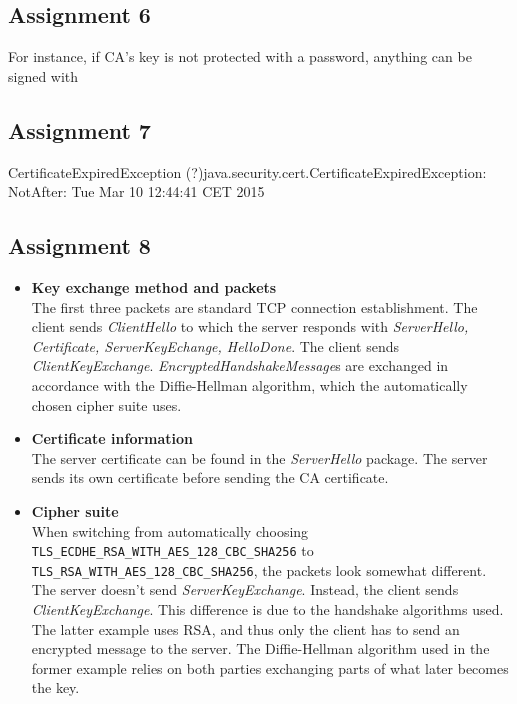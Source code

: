 \documentclass[11pt,a4paper]{article}
\begin{document}
\subsection{Assignment 6}
For instance, if CA's key is not protected with a password, anything can be signed with
\subsection{Assignment 7}
CertificateExpiredException (?)java.security.cert.CertificateExpiredException: NotAfter: Tue Mar 10 12:44:41 CET 2015
\subsection{Assignment 8} 
\begin{itemize}
\item \textbf{Key exchange method and packets}\\The first three packets are standard TCP connection establishment. The client sends \textit{ClientHello} to which the server responds with \textit{ServerHello, Certificate, ServerKeyEchange, HelloDone}. The client sends \textit{ClientKeyExchange}. \textit{EncryptedHandshakeMessage}s are exchanged in accordance with the Diffie-Hellman algorithm, which the automatically chosen cipher suite uses.
\item \textbf{Certificate information}\\
The server certificate can be found in the \textit{ServerHello} package. The server sends its own certificate before sending the CA certificate.
\item \textbf{Cipher suite}\\
When switching from automatically choosing \texttt{TLS\_ECDHE\_RSA\_WITH\_AES\_128\_CBC\_SHA256} to
\texttt{TLS\_RSA\_WITH\_AES\_128\_CBC\_SHA256}, the packets look somewhat different. The server doesn't send \textit{ServerKeyExchange}. Instead, the client sends \textit{ClientKeyExchange}. This difference is due to the handshake algorithms used. The latter example uses RSA, and thus only the client has to send an encrypted message to the server. The Diffie-Hellman algorithm used in the former example relies on both parties exchanging parts of what later becomes the key.
\end{itemize}
\end{document}
